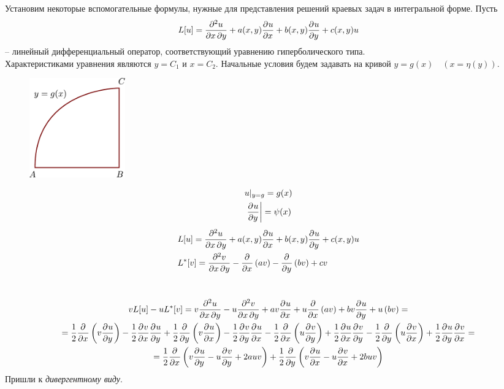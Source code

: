 Установим некоторые вспомогательные формулы, нужные для представления решений краевых задач в интегральной форме. Пусть
\[
	L[u] = \frac{\partial^2u}{\partial x\, \partial y} + a(x, y) \frac{\partial^{}u}{\partial x^{}} + b(x, y) \frac{\partial^{}u}{\partial y^{}} + c(x, y) u 
\]
-- линейный дифференциальный оператор, соответствующий уравнению гиперболического типа.\\
Характеристиками уравнения являются $y = C_1$ и $x = C_2$.
Начальные условия будем задавать на кривой $y = g(x)\quad (x = \eta(y))$.

\begin{figure}
	\centering
	\includegraphics[width=0.2\textwidth]{fighyperriman.pdf}
\end{figure}
\begin{minipage}[t]{0.7\textwidth}
\begin{align*}
	&u|_{y = g} = g(x)\\
	&\left.\frac{\partial^{}u}{\partial y^{}}\right| =  \psi(x)
\end{align*}
\begin{align*}
	&L[u] =  \frac{\partial^2u}{\partial x\, \partial y} + a(x, y) \frac{\partial^{}u}{\partial x^{}} + b(x, y) \frac{\partial^{}u}{\partial y^{}} + c(x, y) u \\
	&L^*[v] = \frac{\partial^2v}{\partial x\, \partial y} - \frac{\partial^{}}{\partial x^{}} \left(a v \right) - \frac{\partial^{}}{\partial y^{}} \left(b v \right) + c  v\\
\end{align*}
\end{minipage}\\


\begin{multline*}
	vL[u] - u L^*[v] = v \frac{\partial^2u}{\partial x\, \partial y} - u \frac{\partial^2v}{\partial x\, \partial y} + a v \frac{\partial^{}u}{\partial x^{}}  + u \frac{\partial^{}}{\partial x^{}} \left(a v \right) + b v \frac{\partial^{}u}{\partial y^{}} + u \left(b v \right) =\\
	= \frac{1}{2} \frac{\partial^{}}{\partial x^{}} \left(v \frac{\partial^{}u}{\partial y^{}} \right) - \frac{1}{2} \frac{\partial^{}v}{\partial x^{}} \frac{\partial^{}u}{\partial y^{}} + \frac{1}{2} \frac{\partial^{}}{\partial y^{}} \left(v \frac{\partial^{}u}{\partial x^{}} \right) - \frac{1}{2} \frac{\partial^{}v}{\partial y^{}} \frac{\partial^{}u}{\partial x^{}} - \frac{1}{2} \frac{\partial^{}}{\partial x^{}} \left(u \frac{\partial^{}v}{\partial y^{}} \right) + \frac{1}{2} \frac{\partial^{}u}{\partial x^{}} \frac{\partial^{}v}{\partial y^{}} - \frac{1}{2} \frac{\partial^{}}{\partial y^{}} \left(u \frac{\partial^{}v}{\partial x^{}} \right) + \frac{1}{2} \frac{\partial^{}u}{\partial y^{}} \frac{\partial^{}v}{\partial x^{}} = \\
	= \frac{1}{2} \frac{\partial^{}}{\partial x^{}} \left(v \frac{\partial^{}u}{\partial y^{}} - u \frac{\partial^{}v}{\partial y^{}} + 2 a u v \right) + \frac{1}{2} \frac{\partial^{}}{\partial y^{}} \left(v \frac{\partial^{}u}{\partial x^{}} - u \frac{\partial^{}v}{\partial x^{}} + 2 b u v \right)
\end{multline*}
Пришли к \textit{дивергентному виду}.

